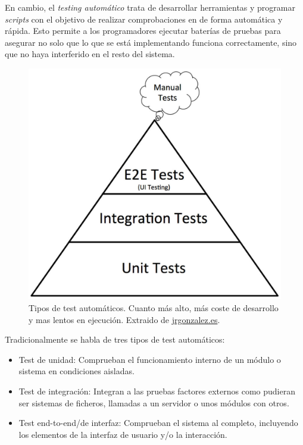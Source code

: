En cambio, el \textit{testing automático} trata de desarrollar herramientas y programar \textit{scripts} con el objetivo de realizar comprobaciones en de forma automática y rápida. Esto permite a los programadores ejecutar baterías de pruebas para asegurar no solo que lo que se está implementando funciona correctamente, sino que no haya interferido en el resto del sistema.

\begin{figure}[h]
    \centering
    \includegraphics[scale=0.20]{img/piramide.jpg}
    \caption[Tipos de tests automáticos]{Tipos de test automáticos. Cuanto más alto, más coste de desarrollo y mas lentos en ejecución. Extraido de \href{https://jrgonzalez.es/piramide-de-tests-automaticos}{jrgonzalez.es}.}
    \label{fig:piramide-test}
\end{figure}

Tradicionalmente se habla de tres tipos de test automáticos:

\begin{itemize}
    \item Test de unidad: Comprueban el funcionamiento interno de un módulo o sistema en condiciones aisladas.
    \item Test de integración: Integran a las pruebas factores externos como pudieran ser sistemas de ficheros, llamadas a un servidor o unos módulos con otros.
    \item Test end-to-end/de interfaz: Comprueban el sistema al completo, incluyendo los elementos de la interfaz de usuario y/o la interacción.
\end{itemize}

